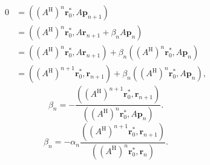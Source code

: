 \[\begin{aligned}0&=((A^{\mathrm H})^n\bm r_0^{*},A\bm p_{n+1})\\&=((A^{\mathrm H})^n\bm r_0^{*},A\bm r_{n+1}+\beta_nA\bm p_n)\\&=((A^{\mathrm H})^n\bm r_0^{*},A\bm r_{n+1})+\beta_n((A^{\mathrm H})^n\bm r_0^{*},A\bm p_n)\\&=((A^{\mathrm H})^{n+1}\bm r_0^{*},\bm r_{n+1})+\beta_n((A^{\mathrm H})^n\bm r_0^{*},A\bm p_n),\end{aligned}\]
\[\beta_n=-\frac{((A^{\mathrm H})^{n+1}\bm r_0^{*},\bm r_{n+1})}{((A^{\mathrm H})^n\bm r_0^{*},A\bm p_n)}.\]
\begin{equation}\label{eq:bicg-beta-shadow-power}\beta_n=-\alpha_n\frac{((A^{\mathrm H})^{n+1}\bm r_0^{*},\bm r_{n+1})}{((A^{\mathrm H})^n\bm r_0^{*},\bm r_n)}.\end{equation}
